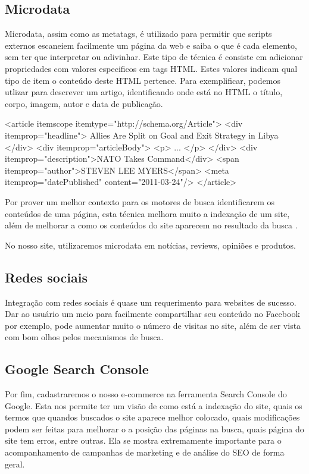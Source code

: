 \documentclass[
	12pt,				%
    oneside,			%
	a4paper,			%
	english,			%
	french,				%
	spanish,			%
	brazil				%
	]{abntex2}
\begin{document}
\subsection{Microdata}
Microdata, assim como as metatags, é utilizado para permitir que scripts externos escaneiem facilmente um página da web e saiba o que é cada elemento, sem ter que interpretar ou adivinhar. Este tipo de técnica é consiste em adicionar propriedades com valores especificos em tags HTML. Estes valores indicam qual tipo de item o conteúdo deste HTML pertence. Para exemplificar, podemos utlizar para descrever um artigo, identificando onde está no HTML o título, corpo, imagem, autor e data de publicação.

\begin{center}
  <article itemscope itemtype="http://schema.org/Article">
    <div itemprop="headline">
      Allies Are Split on Goal and 
      Exit Strategy in Libya
    </div>
    <div itemprop="articleBody"> 
      <p> ... </p>
    </div>
    <div itemprop="description">NATO Takes Command</div> 
    <span itemprop="author">STEVEN LEE MYERS</span> 
    <meta itemprop="datePublished" content="2011-03-24"/>
  </article>
\end{center}

Por prover um melhor contexto para os motores de busca identificarem os conteúdos de uma página, esta técnica melhora muito a indexação de um site, além de melhorar a como os conteúdos do site aparecem no resultado da busca \cite{Microdata}.

No nosso site, utilizaremos microdata em notícias, reviews, opiniões e produtos.

\subsection{Redes sociais}
Integração com redes sociais é quase um requerimento para websites de sucesso. Dar ao usuário um meio para facilmente compartilhar seu conteúdo no Facebook por exemplo, pode aumentar muito o número de visitas no site, além de ser vista com bom olhos pelos mecanismos de busca.

\subsection{Google Search Console}
Por fim, cadastraremos o nosso e-commerce na ferramenta Search Console do Google. Esta nos permite ter um visão de como está a indexação do site, quais os termos que quandos buscados o site aparece melhor colocado, quais modificações podem ser feitas para melhorar o a posição das páginas na busca, quais página do site tem erros, entre outras. Ela se mostra extremamente importante para o acompanhamento de campanhas de marketing e de análise do SEO de forma geral.
\end{document}
